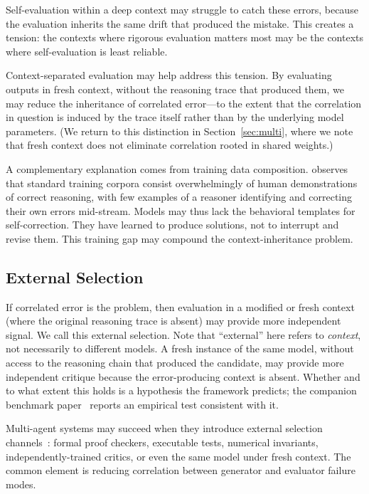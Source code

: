 \documentclass[11pt]{article}
\begin{document}
Self-evaluation within a deep context may struggle to catch these errors, because the evaluation inherits the same drift that produced the mistake. This creates a tension: the contexts where rigorous evaluation matters most may be the contexts where self-evaluation is least reliable.

Context-separated evaluation may help address this tension. By evaluating outputs in fresh context, without the reasoning trace that produced them, we may reduce the inheritance of correlated error---to the extent that the correlation in question is induced by the trace itself rather than by the underlying model parameters. (We return to this distinction in Section~\ref{sec:multi}, where we note that fresh context does not eliminate correlation rooted in shared weights.)

A complementary explanation comes from training data composition. \citet{tsui2025selfcorrection} observes that standard training corpora consist overwhelmingly of human demonstrations of correct reasoning, with few examples of a reasoner identifying and correcting their own errors mid-stream. Models may thus lack the behavioral templates for self-correction. They have learned to produce solutions, not to interrupt and revise them. This training gap may compound the context-inheritance problem.

\subsection{External Selection}

If correlated error is the problem, then evaluation in a modified or fresh context (where the original reasoning trace is absent) may provide more independent signal. We call this external selection. Note that ``external'' here refers to \textit{context}, not necessarily to different models. A fresh instance of the same model, without access to the reasoning chain that produced the candidate, may provide more independent critique because the error-producing context is absent. Whether and to what extent this holds is a hypothesis the framework predicts; the companion benchmark paper~\citep{brilliant2026benchmark} reports an empirical test consistent with it.

Multi-agent systems may succeed when they introduce external selection channels~\citep{du2023debate}: formal proof checkers, executable tests, numerical invariants, independently-trained critics, or even the same model under fresh context. The common element is reducing correlation between generator and evaluator failure modes.
\end{document}
